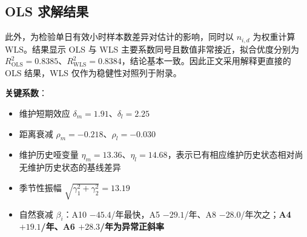 \documentclass[12pt, a4paper, fontset=fandol]{ctexart}
\theoremstyle{definition}
\begin{document}
\subsection{OLS 求解结果}

\begin{table}[H]
\centering
\caption{Q1 主回归关键参数估计结果}
\label{tab:Q1_key_params}
\small
{}
\end{table}

此外，为检验单日有效小时样本数差异对估计的影响，同时以 $n_{i,d}$ 为权重计算 WLS。结果显示 OLS 与 WLS 主要系数同号且数值非常接近，拟合优度分别为 $R^2_{\mathrm{OLS}}=0.8385$、$R^2_{\mathrm{WLS}}=0.8384$，结论基本一致。因此正文采用解释更直接的 OLS 结果，WLS 仅作为稳健性对照列于附录。

\medskip

\textbf{关键系数}：
\begin{itemize}[leftmargin=2em]
  \item 维护短期效应 $\delta_m = 1.91$、$\delta_l = 2.25$
  \item 距离衰减 $\rho_m = -0.218$、$\rho_l = -0.030$
  \item 维护历史哑变量 $\eta_m = 13.36$、$\eta_l = 14.68$，表示已有相应维护历史状态相对尚无维护历史状态的基线差异
  \item 季节性振幅 $\sqrt{\gamma_1^2 + \gamma_2^2} = 13.19$
  \item 自然衰减 $\beta_i$：A10 $-45.4$/年最快，A5 $-29.1$/年、A8 $-28.0$/年次之；\textbf{A4 $+19.1$/年、A6 $+28.3$/年为异常正斜率}
\end{itemize}
\end{document}
